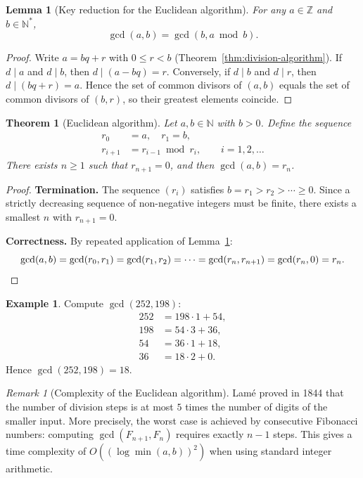 \documentclass[12pt,a4paper,openany]{book}
\theoremstyle{definition}
\newtheorem{example}[definition]{Example}
\theoremstyle{plain}
\newtheorem{theorem}[definition]{Theorem}
\newtheorem{lemma}[definition]{Lemma}
\theoremstyle{remark}
\newtheorem{remark}[definition]{Remark}
\newcommand{\N}{\mathbb{N}}
\newcommand{\Z}{\mathbb{Z}}
\begin{document}
\begin{lemma}[Key reduction for the Euclidean algorithm]
\label{lem:gcd-reduction}
For any $a \in \Z$ and $b \in \N^{*}$,
\[
  \gcd(a, b) = \gcd(b, a \bmod b).
\]
\end{lemma}

\begin{proof}
Write $a = bq + r$ with $0 \le r < b$ (Theorem~\ref{thm:division-algorithm}).
If $d \mid a$ and $d \mid b$, then $d \mid (a - bq) = r$. Conversely, if
$d \mid b$ and $d \mid r$, then $d \mid (bq + r) = a$. Hence the set of
common divisors of $(a,b)$ equals the set of common divisors of $(b,r)$,
so their greatest elements coincide.
\end{proof}

\begin{theorem}[Euclidean algorithm]
\label{thm:euclidean-algorithm}
Let $a, b \in \N$ with $b > 0$. Define the sequence
\begin{align*}
  r_0 &= a, \quad r_1 = b, \\
  r_{i+1} &= r_{i-1} \bmod r_i, \qquad i = 1, 2, \ldots
\end{align*}
There exists $n \ge 1$ such that $r_{n+1} = 0$, and then
$\gcd(a,b) = r_n$.
\end{theorem}

\begin{proof}
\textbf{Termination.}
The sequence $(r_i)$ satisfies $b = r_1 > r_2 > \cdots \ge 0$.
Since a strictly decreasing sequence of non-negative integers must be finite,
there exists a smallest $n$ with $r_{n+1} = 0$.

\medskip
\textbf{Correctness.}
By repeated application of Lemma~\ref{lem:gcd-reduction}:
\[
  \gcd(a,b) = \gcd(r_0, r_1) = \gcd(r_1, r_2) = \cdots
  = \gcd(r_n, r_{n+1}) = \gcd(r_n, 0) = r_n. \qedhere
\]
\end{proof}

\begin{example}
\label{ex:euclidean-algorithm}
Compute $\gcd(252, 198)$:
\begin{align*}
  252 &= 198 \cdot 1 + 54, \\
  198 &= 54 \cdot 3 + 36, \\
  54 &= 36 \cdot 1 + 18, \\
  36 &= 18 \cdot 2 + 0.
\end{align*}
Hence $\gcd(252, 198) = 18$.
\end{example}

\begin{remark}[Complexity of the Euclidean algorithm]
\label{rem:euclidean-complexity}
Lam\'{e} proved in 1844 that the number of division steps is at most
$5$ times the number of digits of the smaller input. More precisely,
the worst case is achieved by consecutive Fibonacci numbers: computing
$\gcd(F_{n+1}, F_n)$ requires exactly $n-1$ steps. This gives a time
complexity of $O((\log \min(a,b))^2)$ when using standard integer arithmetic.
\end{remark}
\end{document}
